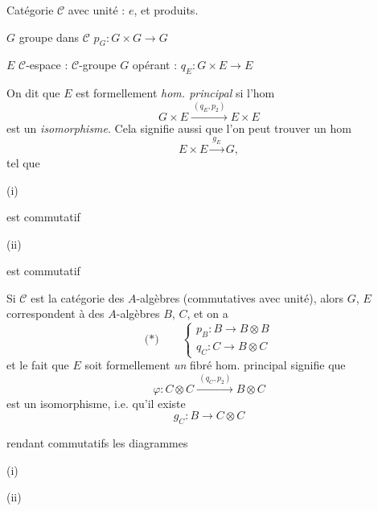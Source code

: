 \documentclass[11pt,a4paper]{article}
\begin{document}

Catégorie $\mathcal{C}$ avec unité : \ill{} $e$, et produits.

$G$ groupe dans $\mathcal{C}$ \quad $p_G : G \times G \to G$

$E$ $\mathcal{C}$-espace : $\mathcal{C}$-groupe $G$ opérant :
\quad $q_E : G \times E \to E$

On dit que $E$ est formellement \emph{hom. principal} si l'hom
\[
G \times E \xrightarrow{\ (q_E, p_2)\ } E \times E
\]
est un \emph{isomorphisme}. Cela signifie
aussi que l'on peut trouver un hom
\[
E \times E \xrightarrow{\ g_E\ } G ,
\]
tel que

(i)


est commutatif

(ii)


est commutatif

Si $\mathcal{C}$ est la catégorie des $A$-algèbres (commutatives avec
unité), alors $G$, $E$ correspondent à des $A$-algèbres \struck{\ill{}}
$B$, $C$, et on a
\[
\text{(*)} \qquad
\left\lbrace
\begin{array}{l}
p_B : B \longrightarrow B \otimes B \\
q_C : C \longrightarrow B \otimes C
\end{array}
\right.
\]
et le fait que $E$ soit formellement \emph{un} fibré hom. principal
signifie que
\[
\varphi : C \otimes C \xrightarrow{\ (q_C, p_2)\ } B \otimes C
\]
est un isomorphisme, i.e. qu'il existe
\[
g_C : B \longrightarrow C \otimes C
\]


rendant commutatifs les diagrammes

(i)


(ii)

\end{document}
